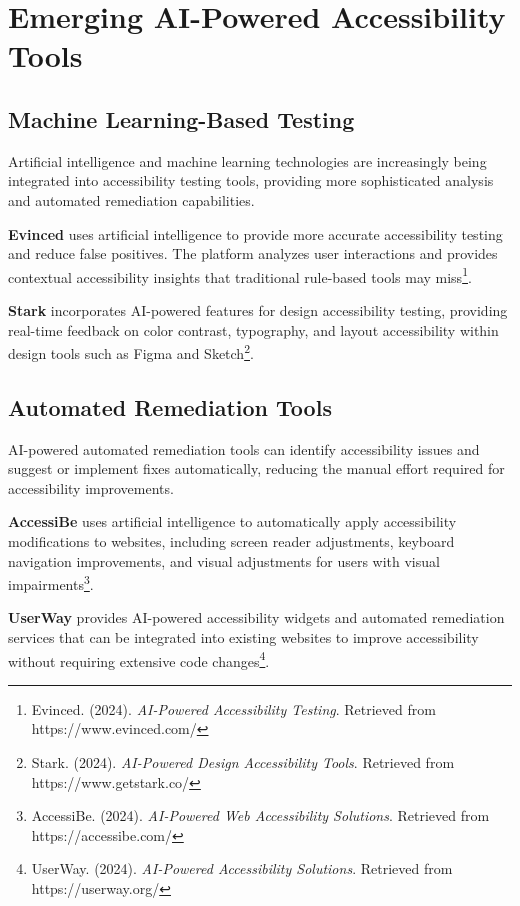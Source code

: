\section{Emerging AI-Powered Accessibility Tools}

\subsection{Machine Learning-Based Testing}

Artificial intelligence and machine learning technologies are increasingly being integrated into accessibility testing tools, providing more sophisticated analysis and automated remediation capabilities.

\textbf{Evinced} uses artificial intelligence to provide more accurate accessibility testing and reduce false positives. The platform analyzes user interactions and provides contextual accessibility insights that traditional rule-based tools may miss\footnote{Evinced. (2024). \textit{AI-Powered Accessibility Testing}. Retrieved from https://www.evinced.com/}.

\textbf{Stark} incorporates AI-powered features for design accessibility testing, providing real-time feedback on color contrast, typography, and layout accessibility within design tools such as Figma and Sketch\footnote{Stark. (2024). \textit{AI-Powered Design Accessibility Tools}. Retrieved from https://www.getstark.co/}.

\subsection{Automated Remediation Tools}

AI-powered automated remediation tools can identify accessibility issues and suggest or implement fixes automatically, reducing the manual effort required for accessibility improvements.

\textbf{AccessiBe} uses artificial intelligence to automatically apply accessibility modifications to websites, including screen reader adjustments, keyboard navigation improvements, and visual adjustments for users with visual impairments\footnote{AccessiBe. (2024). \textit{AI-Powered Web Accessibility Solutions}. Retrieved from https://accessibe.com/}.

\textbf{UserWay} provides AI-powered accessibility widgets and automated remediation services that can be integrated into existing websites to improve accessibility without requiring extensive code changes\footnote{UserWay. (2024). \textit{AI-Powered Accessibility Solutions}. Retrieved from https://userway.org/}.

